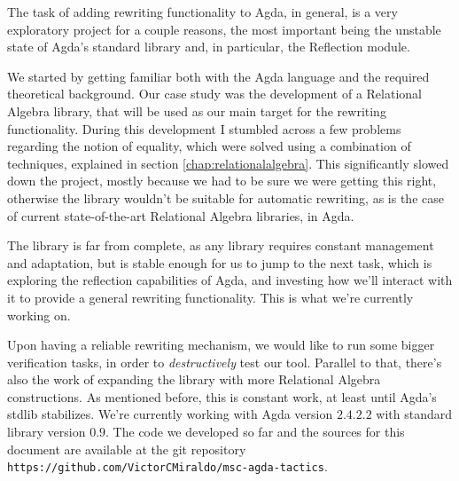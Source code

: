 The task of adding rewriting functionality to Agda, in general, is a very exploratory 
project for a couple reasons, the most important being the unstable state of Agda's
standard library and, in particular, the Reflection module. 

We started by getting familiar both with the Agda language and the required theoretical background. 
Our case study was the development of a Relational Algebra library, 
that will be used as our main target for the rewriting functionality.
During this development I stumbled across a few problems regarding the notion of equality, 
which were solved using a combination of techniques, explained in section \ref{chap:relationalalgebra}.
This significantly slowed down the project, mostly because we had to be sure we were getting
this right, otherwise the library wouldn't be suitable for automatic rewriting, as is the case
of current state-of-the-art Relational Algebra libraries, in Agda.

The library is far from complete, as any library requires constant
management and adaptation, but is stable enough for us to jump to the next task, which is
exploring the reflection capabilities of Agda, and investing how we'll interact with it
to provide a general rewriting functionality. This is what we're currently working on.

Upon having a reliable rewriting mechanism, we would like to run some bigger verification
tasks, in order to \emph{destructively} test our tool. Parallel to that, there's also the
work of expanding the library with more Relational Algebra constructions. As mentioned before,
this is constant work, at least until Agda's stdlib stabilizes. We're currently working with
Agda version $2.4.2.2$ with standard library version $0.9$. The code we developed so far and
the sources for this document are available at the git repository \texttt{https://github.com/VictorCMiraldo/msc-agda-tactics}.
